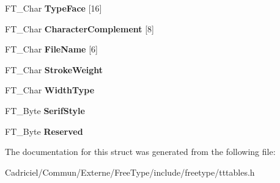 \begin{DoxyCompactItemize}
\item 
F\+T\+\_\+\+Char {\bfseries Type\+Face} \mbox{[}16\mbox{]}\hypertarget{struct_t_t___p_c_l_t___a47c2c6b276f3ab2002fe03af41dad396}{}\label{struct_t_t___p_c_l_t___a47c2c6b276f3ab2002fe03af41dad396}

\item 
F\+T\+\_\+\+Char {\bfseries Character\+Complement} \mbox{[}8\mbox{]}\hypertarget{struct_t_t___p_c_l_t___a2641686beb550bcf8d9e598336f0acd9}{}\label{struct_t_t___p_c_l_t___a2641686beb550bcf8d9e598336f0acd9}

\item 
F\+T\+\_\+\+Char {\bfseries File\+Name} \mbox{[}6\mbox{]}\hypertarget{struct_t_t___p_c_l_t___a87691bde7cb06e3043f5320c8223e768}{}\label{struct_t_t___p_c_l_t___a87691bde7cb06e3043f5320c8223e768}

\item 
F\+T\+\_\+\+Char {\bfseries Stroke\+Weight}\hypertarget{struct_t_t___p_c_l_t___aaf28b05ac07bcdc1ae6f4ec9064434fc}{}\label{struct_t_t___p_c_l_t___aaf28b05ac07bcdc1ae6f4ec9064434fc}

\item 
F\+T\+\_\+\+Char {\bfseries Width\+Type}\hypertarget{struct_t_t___p_c_l_t___ad6613ad7556599343f999a7d27a0f1d0}{}\label{struct_t_t___p_c_l_t___ad6613ad7556599343f999a7d27a0f1d0}

\item 
F\+T\+\_\+\+Byte {\bfseries Serif\+Style}\hypertarget{struct_t_t___p_c_l_t___aa8e3d35937660a1e4959ee10a4800e6a}{}\label{struct_t_t___p_c_l_t___aa8e3d35937660a1e4959ee10a4800e6a}

\item 
F\+T\+\_\+\+Byte {\bfseries Reserved}\hypertarget{struct_t_t___p_c_l_t___a2e46e3f5eaa51e02d831d3f6143f8846}{}\label{struct_t_t___p_c_l_t___a2e46e3f5eaa51e02d831d3f6143f8846}

\end{DoxyCompactItemize}


The documentation for this struct was generated from the following file\+:\begin{DoxyCompactItemize}
\item 
Cadriciel/\+Commun/\+Externe/\+Free\+Type/include/freetype/tttables.\+h\end{DoxyCompactItemize}
